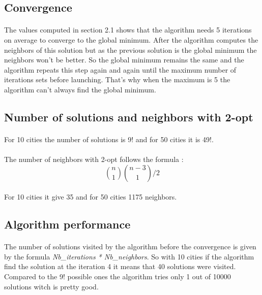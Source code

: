 \documentclass[12pt,oneside,a4paper]{article}
\begin{document}
\subsection{Convergence}
\paragraph{}
    The values computed in section 2.1 shows that the algorithm needs 5 iterations on average to converge to the
    global minimum. After the algorithm computes the neighbors of this solution but as the previous solution is the
    global minimum the neighbors won't be better. So the global minimum remains the same and the algorithm repeats this step
    again and again until the maximum number of iterations sets before launching. That's why when the maximum is 5 the
    algorithm can't always find the global minimum.

\subsection{Number of solutions and neighbors with 2-opt}
\paragraph{}
    For 10 cities the number of solutions is 9! and for 50 cities it is 49!.
\paragraph{}
    The number of neighbors with 2-opt follows the formula :
    \[\binom{n}{1}\binom{n-3}{1}/2\]
\paragraph{}
    For 10 cities it give 35 and for 50 cities 1175 neighbors.

\subsection{Algorithm performance}
\paragraph{}
    The number of solutions visited by the algorithm before the convergence is given by the formula
    \textit{Nb\_iterations * Nb\_neighbors}. So with 10 cities if the algorithm find the solution at the 
    iteration 4 it means that 40 solutions were visited. Compared to the 9! possible ones the algorithm tries only 1
    out of 10000 solutions witch is pretty good.
\end{document}
